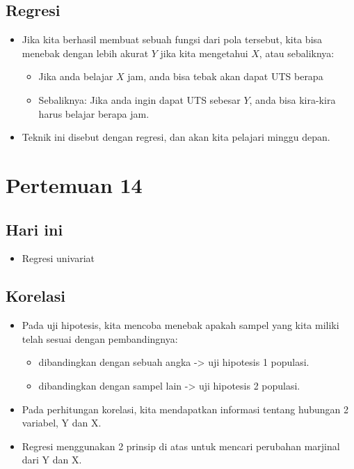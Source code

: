 \documentclass[
  letterpaper,
  DIV=11,
  numbers=noendperiod]{scrartcl}
\providecommand{\tightlist}{%
  \setlength{\itemsep}{0pt}\setlength{\parskip}{0pt}}\usepackage{longtable,booktabs,array}
\begin{document}
\hypertarget{regresi}{%
\subsection{Regresi}\label{regresi}}

\begin{itemize}
\item
  Jika kita berhasil membuat sebuah fungsi dari pola tersebut, kita bisa
  menebak dengan lebih akurat \(Y\) jika kita mengetahui \(X\), atau
  sebaliknya:

  \begin{itemize}
  \item
    Jika anda belajar \(X\) jam, anda bisa tebak akan dapat UTS berapa
  \item
    Sebaliknya: Jika anda ingin dapat UTS sebesar \(Y\), anda bisa
    kira-kira harus belajar berapa jam.
  \end{itemize}
\item
  Teknik ini disebut dengan regresi, dan akan kita pelajari minggu
  depan.
\end{itemize}

\hypertarget{pertemuan-14}{%
\section{Pertemuan 14}\label{pertemuan-14}}

\hypertarget{hari-ini-4}{%
\subsection{Hari ini}\label{hari-ini-4}}

\begin{itemize}
\tightlist
\item
  Regresi univariat
\end{itemize}

\hypertarget{korelasi-2}{%
\subsection{Korelasi}\label{korelasi-2}}

\begin{itemize}
\item
  Pada uji hipotesis, kita mencoba menebak apakah sampel yang kita
  miliki telah sesuai dengan pembandingnya:

  \begin{itemize}
  \item
    dibandingkan dengan sebuah angka -\textgreater{} uji hipotesis 1
    populasi.
  \item
    dibandingkan dengan sampel lain -\textgreater{} uji hipotesis 2
    populasi.
  \end{itemize}
\item
  Pada perhitungan korelasi, kita mendapatkan informasi tentang hubungan
  2 variabel, Y dan X.
\item
  Regresi menggunakan 2 prinsip di atas untuk mencari perubahan marjinal
  dari Y dan X.
\end{itemize}
\end{document}

